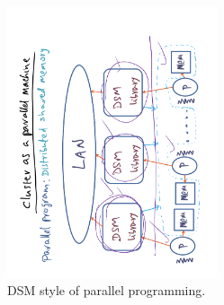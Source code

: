 \documentclass[11pt]{lecture}
\def\fullsize{0.55\textwidth}
\begin{document}
\begin{figure}
\centering
\includegraphics[width=\fullsize,angle=-90]{Figures/distributed-shared-memory}
\caption{DSM style of parallel programming.}\label{fig: distributed-shared-memory}
\end{figure}
\end{document}
